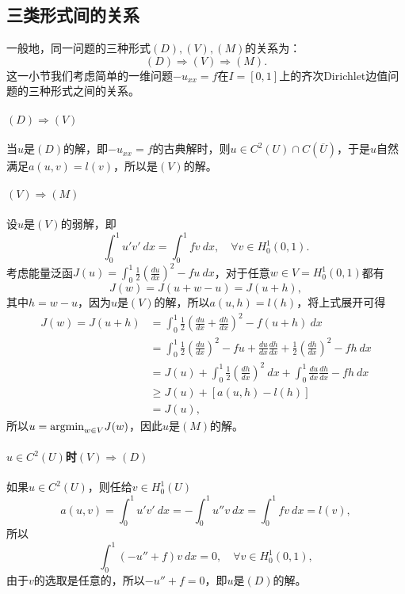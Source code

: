 \documentclass[a4paper,10pt]{ctexart}
\begin{document}
\subsection{三类形式间的关系}
一般地，同一问题的三种形式$ (D),(V),(M) $的关系为：
\begin{equation}
    (D)\Rightarrow (V)\Rightarrow (M).
\end{equation}
这一小节我们考虑简单的一维问题$ -u_{xx} = f $在$ I=[0,1] $上的齐次Dirichlet边值问题的三种形式之间的关系。
\paragraph*{$ (D)\Rightarrow (V) $} 当$ u $是$ (D) $的解，即$ -u_{xx} = f $的古典解时，则$ u\in C^2(U)\cap C(\overline{U}) $，于是$ u $自然满足$ a(u,v) = l(v) $，所以是$ (V) $的解。 

\paragraph*{$ (V)\Rightarrow (M) $} 设$ u $是$ (V) $的弱解，即
\[
    \int_0^1 u'v'\ d x = \int_0^1 fv\ d x,\quad \forall v\in H^1_0(0,1).
\]
考虑能量泛函$ J(u) = \int_0^1 \frac{1}{2}(\frac{du}{dx})^2 - fu \ dx $，对于任意$ w\in V=H^1_0(0,1) $都有
\[
    J(w) = J(u+w-u) = J(u+h),
\]
其中$ h = w-u $，因为$ u $是$ (V) $的解，所以$ a(u,h) = l(h) $，将上式展开可得
\[
    \begin{aligned}
        J(w) = J(u+h) &= \int_0^1 \frac{1}{2}(\frac{du}{dx}+\frac{dh}{dx})^2 - f(u+h)\ dx\\
        &= \int_0^1 \frac{1}{2}(\frac{du}{dx})^2 - fu + \frac{du}{dx}\frac{dh}{dx} + \frac{1}{2}(\frac{dh}{dx})^2 - fh\ dx\\
        &= J(u) + \int_0^1 \frac{1}{2}(\frac{dh}{dx})^2\ dx + \int_0^1 \frac{du}{dx}\frac{dh}{dx}-fh\ dx\\
        &\geqslant J(u) + [a(u,h) - l(h)]\\
        &= J(u),
    \end{aligned}
\]
所以$ u = {\rm arg min}_{w\in V} J(w) $，因此$ u $是$ (M) $的解。

\paragraph*{$ u\in C^2(U) $时$ (V)\Rightarrow (D) $} 如果$ u\in C^2(U) $，则任给$ v\in H^1_0(U) $
\[
    a(u,v) = \int_0^1 u'v'\ dx = - \int_0^1 u''v\ dx = \int_0^1 fv\ dx = l(v),
\]
所以
\[
    \int_0^1 (-u''+f)v\ dx = 0,\quad \forall v\in H^1_0(0,1),
\]
由于$ v $的选取是任意的，所以$ -u''+f = 0 $，即$ u $是$ (D) $的解。
\end{document}
